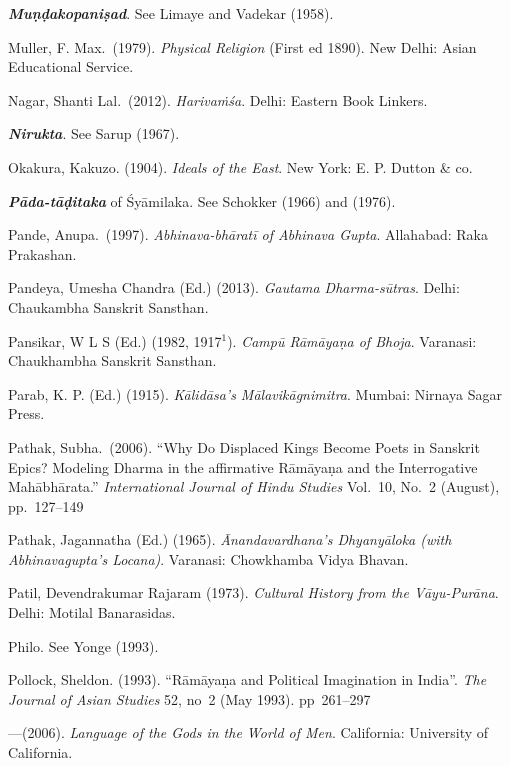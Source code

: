 \begin{thebibliography}{99}
{\sl\bfseries Muṇḍakopaniṣad}. See Limaye and Vadekar (1958).

Muller, F. Max.\ (1979). {\sl Physical Religion} (First ed 1890). New Delhi: Asian Educational Service. 

Nagar, Shanti Lal.\ (2012). {\sl Harivaṁśa}. Delhi: Eastern Book Linkers. 

{\sl\bfseries Nirukta}. See Sarup (1967).

Okakura, Kakuzo. (1904). {\sl Ideals of the East}. New York: E. P. Dutton \& co. 

{\sl\bfseries Pāda-tāḍitaka} of Śyāmilaka. See Schokker (1966) and (1976).

Pande, Anupa.\ (1997). {\sl Abhinava-bhāratī of Abhinava Gupta}. Allahabad: Raka Prakashan. 

Pandeya, Umesha Chandra (Ed.) (2013). {\sl Gautama Dharma-sūtras}. Delhi: Chaukambha Sanskrit Sansthan. 

Pansikar, W L S (Ed.) (1982, 1917$^{1}$). {\sl Campū Rāmāyaṇa of Bhoja}. Varanasi: Chaukhambha Sanskrit Sansthan.

Parab, K. P. (Ed.) (1915). {\sl Kālidāsa’s Mālavikāgnimitra}. Mumbai: Nirnaya Sagar Press. 

Pathak, Subha.\ (2006). “Why Do Displaced Kings Become Poets in Sanskrit Epics? Modeling Dharma in the affirmative Rāmāyaṇa and the Interrogative Mahābhārata.” {\sl International Journal of Hindu Studies} Vol.~10, No.~2 (August), pp.~127--149

Pathak, Jagannatha (Ed.) (1965). {\sl Ānandavardhana’s Dhyanyāloka (with Abhinavagupta’s Locana)}. Varanasi: Chowkhamba Vidya Bhavan. 

Patil, Devendrakumar Rajaram (1973). {\sl Cultural History from the Vāyu-Purāna}. Delhi: Motilal Banarasidas. 

Philo. See Yonge (1993).

Pollock, Sheldon. (1993). “Rāmāyaṇa and Political Imagination in India”. {\sl The Journal of Asian Studies} 52, no~2 (May 1993). pp~261--297

---\kern3pt(2006). {\sl Language of the Gods in the World of Men}. California: University of California. 


\end{thebibliography}
